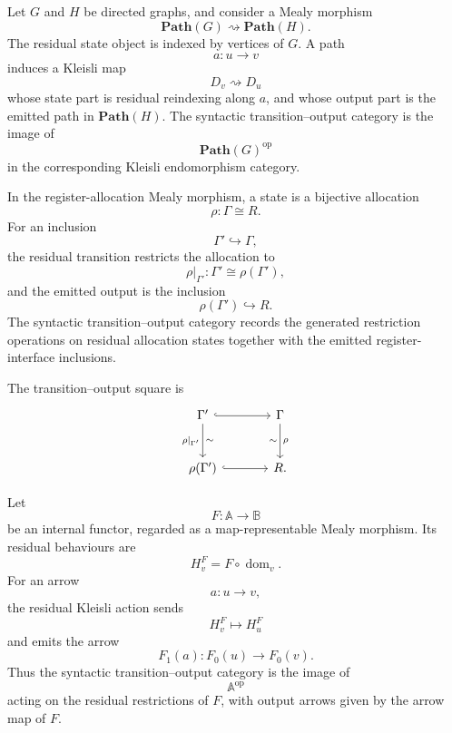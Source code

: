 \begin{example}
\label{ex:syn-to-typed-path-category-machines}
    Let \(G\) and \(H\) be directed graphs, and consider a Mealy morphism
    \[
        \mathbf{Path}(G)\rightsquigarrow\mathbf{Path}(H).
    \]
    The residual state object is indexed by vertices of \(G\). A path
    \[
        a:u\to v
    \]
    induces a Kleisli map
    \[
        D_v\rightsquigarrow D_u
    \]
    whose state part is residual reindexing along \(a\), and whose output part
    is the emitted path in \(\mathbf{Path}(H)\). The syntactic
    transition--output category is the image of
    \[
        \mathbf{Path}(G)^{\mathrm{op}}
    \]
    in the corresponding Kleisli endomorphism category.
\end{example}

\begin{example}
\label{ex:syn-to-register-allocation}
    In the register-allocation Mealy morphism, a state is a bijective
    allocation
    \[
        \rho:\Gamma\cong R.
    \]
    For an inclusion
    \[
        \Gamma'\hookrightarrow\Gamma,
    \]
    the residual transition restricts the allocation to
    \[
        \rho|_{\Gamma'}:\Gamma'\cong \rho(\Gamma'),
    \]
    and the emitted output is the inclusion
    \[
        \rho(\Gamma')\hookrightarrow R.
    \]
    The syntactic transition--output category records the generated restriction
    operations on residual allocation states together with the emitted
    register-interface inclusions.

    The transition--output square is
    \[
    \begin{tikzcd}[column sep=large, row sep=large]
        \Gamma'
            \arrow[r, hook]
            \arrow[d, "{\rho|_{\Gamma'}}"', "\sim"]
        &
        \Gamma
            \arrow[d, "{\rho}", "\sim"']
    \\
        \rho(\Gamma')
            \arrow[r, hook]
        &
        R .
    \end{tikzcd}
    \]
\end{example}

\begin{example}
\label{ex:syn-to-stateless-functors}
    Let
    \[
        F:\mathbb A\to\mathbb B
    \]
    be an internal functor, regarded as a map-representable Mealy morphism. Its
    residual behaviours are
    \[
        H_v^F=F\circ\operatorname{dom}_v.
    \]
    For an arrow
    \[
        a:u\to v,
    \]
    the residual Kleisli action sends
    \[
        H_v^F\longmapsto H_u^F
    \]
    and emits the arrow
    \[
        F_1(a):F_0(u)\to F_0(v).
    \]
    Thus the syntactic transition--output category is the image of
    \[
        \mathbb A^{\mathrm{op}}
    \]
    acting on the residual restrictions of \(F\), with output arrows given by
    the arrow map of \(F\).
\end{example}

